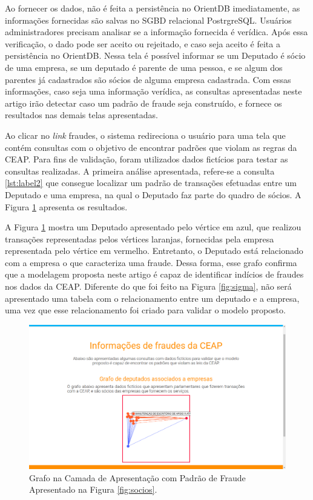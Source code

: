 \documentclass[12pt]{article}
\begin{document}
Ao fornecer os dados, não é feita a persistência no OrientDB imediatamente, as informações fornecidas são salvas no SGBD relacional PostrgreSQL. Usuários administradores precisam analisar se a informação fornecida é verídica. Após essa verificação, o dado pode ser aceito ou rejeitado, e caso seja aceito é feita a persistência no OrientDB. Nessa tela é possível informar se um Deputado é sócio de uma empresa, se um deputado é parente de uma pessoa, e se algum dos parentes já cadastrados são sócios de alguma empresa cadastrada. Com essas informações, caso seja uma informação verídica, as consultas apresentadas neste artigo irão detectar caso um padrão de fraude seja construído, e fornece os resultados nas demais telas apresentadas.

Ao clicar no \textit{link} fraudes, o sistema redireciona o usuário para uma tela que contém consultas com o objetivo de encontrar padrões que violam as regras da CEAP. Para fins de validação, foram utilizados dados fictícios para testar as consultas realizadas. A primeira análise apresentada, refere-se a consulta \ref{lst:label2} que consegue localizar um padrão de transações efetuadas entre um Deputado e uma empresa, na qual o Deputado faz parte do quadro de sócios. A Figura \ref{fig:partner} apresenta os resultados.

A Figura \ref{fig:partner} mostra um Deputado apresentado pelo vértice em azul, que realizou transações representadas pelos vértices laranjas, fornecidas pela empresa representada pelo vértice em vermelho. Entretanto, o Deputado está relacionado com a empresa o que caracteriza uma fraude. Dessa forma, esse grafo confirma que a modelagem proposta neste artigo é capaz de identificar indícios de fraudes nos dados da CEAP. Diferente do que foi feito na Figura \ref{fig:sigma}, não será apresentado uma tabela com o relacionamento entre um deputado e a empresa, uma vez que esse relacionamento foi criado para validar o modelo proposto.

\begin{figure}[ht]
\centering
\includegraphics[width=.7\textwidth]{partner.png}
\caption{Grafo na Camada de Apresentação com Padrão de Fraude Apresentado na Figura \ref{fig:socios}.}
\label{fig:partner}
\end{figure}
\end{document}
